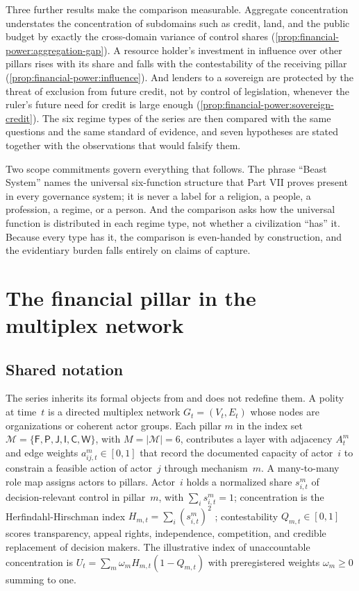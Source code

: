 \documentclass[11pt,letterpaper]{article}
\theoremstyle{definition}
\theoremstyle{remark}
\newcommand{\pF}{\mathsf{F}}
\newcommand{\pP}{\mathsf{P}}
\newcommand{\pJ}{\mathsf{J}}
\newcommand{\pI}{\mathsf{I}}
\newcommand{\pC}{\mathsf{C}}
\newcommand{\pW}{\mathsf{W}}
\newcommand{\Pillars}{\mathcal{M}}
\begin{document}
Three further results make the comparison measurable. Aggregate concentration understates the concentration of subdomains such as credit, land, and the public budget by exactly the cross-domain variance of control shares (\cref{prop:financial-power:aggregation-gap}). A resource holder's investment in influence over other pillars rises with its share and falls with the contestability of the receiving pillar (\cref{prop:financial-power:influence}). And lenders to a sovereign are protected by the threat of exclusion from future credit, not by control of legislation, whenever the ruler's future need for credit is large enough (\cref{prop:financial-power:sovereign-credit}). The six regime types of the series are then compared with the same questions and the same standard of evidence, and seven hypotheses are stated together with the observations that would falsify them.

Two scope commitments govern everything that follows. The phrase ``Beast System'' names the universal six-function structure that Part VII proves present in every governance system; it is never a label for a religion, a people, a profession, a regime, or a person. And the comparison asks how the universal function is distributed in each regime type, not whether a civilization ``has'' it. Because every type has it, the comparison is even-handed by construction, and the evidentiary burden falls entirely on claims of capture.

\section{The financial pillar in the multiplex network}
\label{sec:pillar}

\subsection{Shared notation}

The series inherits its formal objects from \citet{largo2026hbs} and does not redefine them. A polity at time~$t$ is a directed multiplex network $G_t=(V_t,E_t)$ whose nodes are organizations or coherent actor groups. Each pillar $m$ in the index set $\Pillars=\{\pF,\pP,\pJ,\pI,\pC,\pW\}$, with $M=|\Pillars|=6$, contributes a layer with adjacency $A^m_t$ and edge weights $a^m_{ij,t}\in[0,1]$ that record the documented capacity of actor~$i$ to constrain a feasible action of actor~$j$ through mechanism~$m$. A many-to-many role map assigns actors to pillars. Actor~$i$ holds a normalized share $s^m_{i,t}$ of decision-relevant control in pillar~$m$, with $\sum_i s^m_{i,t}=1$; concentration is the Herfindahl-Hirschman index $H_{m,t}=\sum_i (s^m_{i,t})^2$ \citep{hirschman1964}; contestability $Q_{m,t}\in[0,1]$ scores transparency, appeal rights, independence, competition, and credible replacement of decision makers. The illustrative index of unaccountable concentration is $U_t=\sum_m \omega_m H_{m,t}(1-Q_{m,t})$ with preregistered weights $\omega_m\geq 0$ summing to one.
\end{document}
